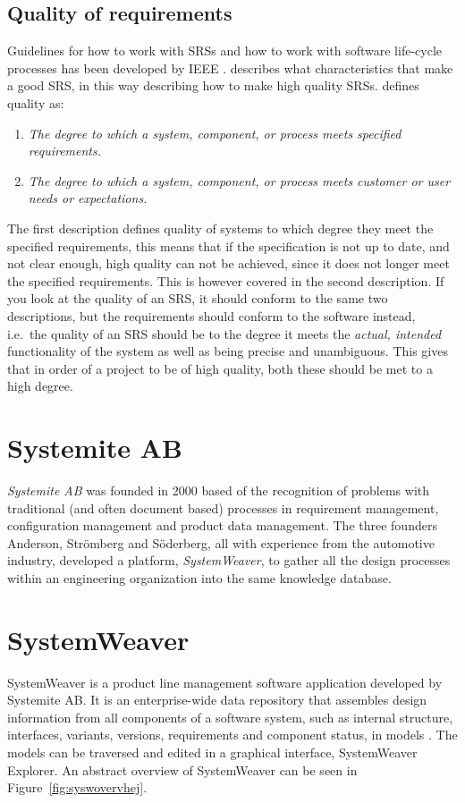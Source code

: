 \subsection{Quality of requirements}
Guidelines for how to work with SRSs and how to work with software life-cycle processes has been developed by IEEE \citep{IEEE12207,IEEE830}. \citet{IEEE830} describes what characteristics that make a good SRS, in this way describing how to make high quality SRSs. \citet{IEEEtermin} defines quality as:
\begin{enumerate}
\item \textit{The degree to which a system, component, or process meets specified requirements.}
\item \textit{The degree to which a system, component, or process meets customer or user needs or expectations.}
\end{enumerate}

The first description defines quality of systems to which degree they meet the specified requirements, this means that if the specification is not up to date, and not clear enough, high quality can not be achieved, since it does not longer meet the specified requirements. This is however covered in the second description. If you look at the quality of an SRS, it should conform to the same two descriptions, but the requirements should conform to the software instead, i.e.\ the quality of an SRS should be to the degree it meets the \emph{actual, intended} functionality of the system as well as being precise and unambiguous. This gives that in order of a project to be of high quality, both these should be met to a high degree.

\section{Systemite AB}
\emph{Systemite AB} was founded in 2000 based of the recognition of problems with traditional (and often document based) processes in requirement management, configuration management and product data management. The three founders Anderson, Strömberg and Söderberg, all with experience from the automotive industry, developed a platform, \emph{SystemWeaver}, to gather all the design processes within an engineering organization into the same knowledge database. 

\section{SystemWeaver}
\label{sec:SystemWeaver}
SystemWeaver is a product line management software application developed by Systemite AB. 
It is an enterprise-wide data repository that assembles design information from all components of a software system, such as internal structure, interfaces, variants, versions, requirements and component status, in models \citep{systemiteStruct}. The models can be traversed and edited in a graphical interface, SystemWeaver Explorer. An abstract overview of SystemWeaver can be seen in Figure~\ref{fig:syswovervhej}.

